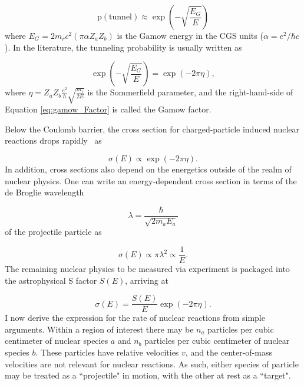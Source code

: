 \documentclass[12pt]{article}
\newcommand{\bigparenthesis}[1]{\left(#1\right)}
\begin{document}
\begin{equation}
    \text{p}(\text{tunnel}) \approx \exp\bigparenthesis{-\sqrt{\frac{E_G}{E}}}
\end{equation}
%
where $E_G = 2m_r c^2 (\pi \alpha Z_a Z_b)$ is the Gamow energy in the CGS units ($\alpha = e^2/\hbar c$). In the literature, the tunneling probability is usually written as

\begin{equation}
    \exp\bigparenthesis{-\sqrt{\frac{E_G}{E}}} = \exp\bigparenthesis{-2\pi\eta}, \label{eq:gamow_Factor}
\end{equation}
%
where $\eta = Z_a Z_b \frac{e^2}{h} \sqrt{\frac{m_r}{2E}}$ is the Sommerfield parameter, and the right-hand-side of Equation \ref{eq:gamow_Factor} is called the Gamow factor.

Below the Coulomb barrier, the cross section for charged-particle induced nuclear reactions drops rapidly~\cite{Rolfs1988} as

\begin{equation}
    \sigma(E) \propto \exp \bigparenthesis{-2\pi\eta}.
\end{equation}
%
In addition, cross sections also depend on the energetics outside of the realm of nuclear physics. One can write an energy-dependent cross section in terms of the de Broglie wavelength 

\begin{equation}
\lambda = \frac{\hbar}{\sqrt{2m_a E_a}}    
\end{equation}
%
of the projectile particle as

\begin{equation}
    \sigma(E) \propto \pi \lambda^2 \propto \frac{1}{E}.
\end{equation}
%
The remaining nuclear physics to be measured via experiment is packaged into the astrophysical S factor $S(E)$, arriving at

\begin{equation}
    \sigma(E) = \frac{S(E)}{E}\exp\bigparenthesis{-2\pi\eta}.
\end{equation}
%
I now derive the expression for the rate of nuclear reactions from simple arguments. Within a region of interest there may be $n_a$ particles per cubic centimeter of nuclear species $a$ and $n_b$ particles per cubic centimeter of nuclear species $b$. These particles have relative velocities $v$, and the center-of-mass velocities are not relevant for nuclear reactions. As such, either species of particle may be treated as a ``projectile" in motion, with the other at rest as a ``target".
\end{document}
